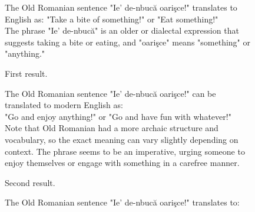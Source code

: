 \documentclass{article}
\begin{document}
\begin{figure*}[h!]
    \centering
    \begin{subfigure}{\textwidth}
        \begin{tcolorbox}[colframe=black!10!white, colback=black!5!white]
            \begin{minipage}{\textwidth}
                \ttfamily
                The Old Romanian sentence "Ie' de-nbucă oarişce!" translates to English as: "Take a bite of something!" or "Eat something!" \\

                The phrase "Ie' de-nbucă" is an older or dialectal expression that suggests taking a bite or eating, and "oarişce" means "something" or "anything."
            \end{minipage}
        \end{tcolorbox}
        \vspace{-0.5\baselineskip}
        \caption{First result.}
        \vspace{0.5\baselineskip}
    \end{subfigure}
    \hfill
    \begin{subfigure}{\textwidth}
        \begin{tcolorbox}[colframe=black!10!white, colback=black!5!white]
            \begin{minipage}{\textwidth}
                \ttfamily
                The Old Romanian sentence "Ie' de-nbucă oarişce!" can be translated to modern English as: \\

                "Go and enjoy anything!" or "Go and have fun with whatever!" \\

                Note that Old Romanian had a more archaic structure and vocabulary, so the exact meaning can vary slightly depending on context. The phrase seems to be an imperative, urging someone to enjoy themselves or engage with something in a carefree manner.
            \end{minipage}
        \end{tcolorbox}
        \vspace{-0.5\baselineskip}
        \caption{Second result.}
        \vspace{0.5\baselineskip}
    \end{subfigure}
    \hfill
    \begin{subfigure}{\textwidth}
        \begin{tcolorbox}[colframe=black!10!white, colback=black!5!white]
            \begin{minipage}{\textwidth}
                \ttfamily
                The Old Romanian sentence "Ie' de-nbucă oarişce!" translates to: \\


\end{minipage}
\end{tcolorbox}
\end{subfigure}
\end{figure*}
\end{document}

